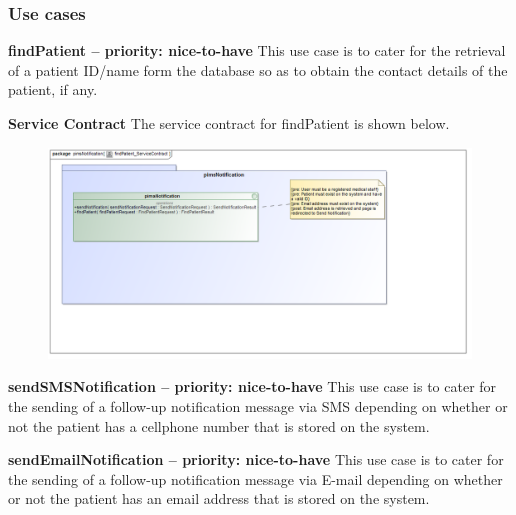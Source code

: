 \subsubsection{Use cases}
\begin{description}
	\item{\textbf{findPatient -- priority: nice-to-have}}
	This use case is to cater for the retrieval of a patient ID/name form the database so as to obtain the contact details of the patient, if any.
	\begin{description}
		\item{\textbf{Service Contract}} The service contract for findPatient is shown below.
		\begin{figure}[h!]
			\includegraphics[width=\linewidth]{./Graphics/pimsNotification/findPatient_ServiceContract}
		\end{figure}
	\end{description}	
	
	\item{\textbf{sendSMSNotification -- priority: nice-to-have}}
	This use case is to cater for the sending of a follow-up notification message via SMS depending on whether or not the patient has a cellphone number that is stored on the system.
	\item{\textbf{sendEmailNotification -- priority: nice-to-have}}
	This use case is to cater for the sending of a follow-up notification message via E-mail depending on whether or not the patient has an email address that is stored on the system.
	

\end{description}
